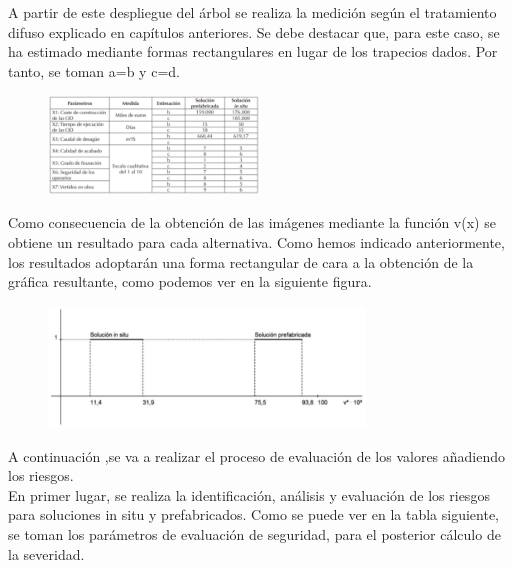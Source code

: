 \documentclass[10pt]{article}
\begin{document}
A partir de este despliegue del árbol se realiza la medición según el tratamiento difuso explicado en capítulos anteriores. Se debe destacar que, para este caso, se ha estimado mediante formas rectangulares en lugar de los trapecios dados. Por tanto, se toman a=b y c=d.

\begin{figure}[H]
	\begin{center}
 		\includegraphics[width = 0.5\textwidth]{Imagenes/img6.eps}
	\end{center} 
\end{figure}

Como consecuencia de la obtención de las imágenes mediante la función v(x) se obtiene un resultado para cada alternativa. Como hemos indicado anteriormente, los resultados adoptarán una forma rectangular de cara a la obtención de la gráfica resultante, como podemos ver en la siguiente figura.

\begin{figure}[H]
	\begin{center}
 		\includegraphics[width = 0.75\textwidth]{Imagenes/img7.eps}
	\end{center} 
\end{figure}

A continuación ,se va a realizar el proceso de evaluación de los valores añadiendo los riesgos.\\

En primer lugar, se realiza la identificación, análisis y evaluación de los riesgos para soluciones in situ y prefabricados.  Como se puede ver en la tabla siguiente, se toman los parámetros de evaluación de seguridad, para el posterior cálculo de la severidad.
\end{document}
